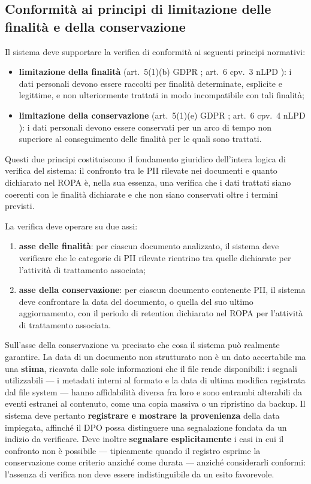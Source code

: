 \subsection{Conformità ai principi di limitazione delle finalità e della conservazione}
\label{sub:conformita-limitazione}
Il sistema deve supportare la verifica di conformità ai seguenti principi normativi:
\begin{itemize}
	\item \textbf{limitazione della finalità} (art.~5(1)(b) GDPR \cite{RegolamentoUE20162016}; art.~6 cpv.~3 nLPD \cite{RS2351Legge}): i dati personali devono essere raccolti per finalità determinate, esplicite e legittime, e non ulteriormente trattati in modo incompatibile con tali finalità;
	\item \textbf{limitazione della conservazione} (art.~5(1)(e) GDPR \cite{RegolamentoUE20162016}; art.~6 cpv.~4 nLPD \cite{RS2351Legge}): i dati personali devono essere conservati per un arco di tempo non superiore al conseguimento delle finalità per le quali sono trattati.
\end{itemize} \medskip

Questi due principi costituiscono il fondamento giuridico dell'intera logica di verifica del sistema: il confronto tra le PII rilevate nei documenti e quanto dichiarato nel ROPA è, nella sua essenza, una verifica che i dati trattati siano coerenti con le finalità dichiarate e che non siano conservati oltre i termini previsti. \medskip

La verifica deve operare su due assi:
\begin{enumerate}
	\item \textbf{asse delle finalità}: per ciascun documento analizzato, il sistema deve verificare che le categorie di PII rilevate rientrino tra quelle dichiarate per l'attività di trattamento associata;
	\item \textbf{asse della conservazione}: per ciascun documento contenente PII, il sistema deve confrontare la data del documento, o quella del suo ultimo aggiornamento, con il periodo di retention dichiarato nel ROPA per l'attività di trattamento associata.
\end{enumerate} \medskip

Sull'asse della conservazione va precisato che cosa il sistema può realmente garantire. La data di un documento non strutturato non è un dato accertabile ma una \textbf{stima}, ricavata dalle sole informazioni che il file rende disponibili: i segnali utilizzabili --- i metadati interni al formato e la data di ultima modifica registrata dal file system --- hanno affidabilità diversa fra loro e sono entrambi alterabili da eventi estranei al contenuto, come una copia massiva o un ripristino da backup. Il sistema deve pertanto \textbf{registrare e mostrare la provenienza} della data impiegata, affinché il DPO possa distinguere una segnalazione fondata da un indizio da verificare. Deve inoltre \textbf{segnalare esplicitamente} i casi in cui il confronto non è possibile --- tipicamente quando il registro esprime la conservazione come criterio anziché come durata --- anziché considerarli conformi: l'assenza di verifica non deve essere indistinguibile da un esito favorevole. \medskip

